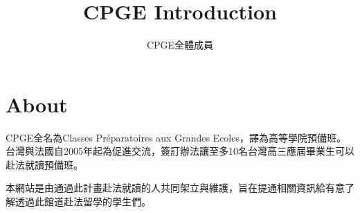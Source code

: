 \documentclass[a4paper]{article}
\title{CPGE Introduction}
\author{CPGE全體成員}
\date{}
\begin{document}
\maketitle

\section*{About}
CPGE全名為Classes Préparatoires aux Grandes Ecoles，譯為高等學院預備班。
台灣與法國自2005年起為促進交流，簽訂辦法讓至多10名台灣高三應屆畢業生可以赴法就讀預備班。

本網站是由通過此計畫赴法就讀的人共同架立與維護，旨在提通相關資訊給有意了解透過此館道赴法留學的學生們。
\end{document}
